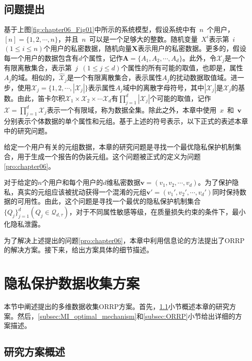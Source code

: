 \subsection{问题提出}\label{sec:chapter06_problem_statement}
基于上图\ref{fig:chapter06_Fig01}中所示的系统模型，假设系统中有~$n$~个用户，$[n]=\{1,2,\cdots,n\}$，并且~$n$~可以是一个足够大的整数。随机变量~$X^i$表示第~$i$~$(1\leq i \leq n)$个用户的私密数据，随机向量$\bm{X}$表示用户的私密数据。更多的，假设每一个用户的数据包含有$d$个属性，记作$\bm{A}=\{A_1,A_2,\cdots,A_d\}$。此外，令$\mathcal{X}_j$是一个有限离散集合，表示第~$j$~$(1 \leq j \leq d)$个属性的所有可能的取值，也即是，属性$A_j$的域。相似的，$\hat{\mathcal{X}}_j$是一个有限离散集合，表示属性$A_j$的扰动数据取值域。进一步，使用$\mathcal{X}_j=\{1,2,\cdots,|\mathcal{X}_j|\}$表示属性$A_j$域中的离散字母符号，其中$|\mathcal{X}_j|$是$\mathcal{X}_j$的基数。由此，笛卡尔积$\mathcal{X}_1\times \mathcal{X}_2\times \cdots \mathcal{X}_d$有$\prod_{j=1}^{d}|\mathcal{X}_j|$个可能的取值，记作$\mathcal{X}=\prod_{j=1}^{d}\mathcal{X}_j$表示一个有限域，称为数据全集。除此之外，本章中使用~$x$~和~$\bm{v}~$分别表示个体数据的单个属性和元组。基于上述的符号表示，以下正式的表述本章中的研究问题。


给定一个用户有关的元组数据，本章的研究问题是寻找一个最优隐私保护机制集合，用于生成一个报告的伪装元组。这个问题被正式的定义为问题\ref{pro:chapter06}。

\begin{problem}\label{pro:chapter06}
对于给定的$n$个用户和每个用户的$d$维私密数据$\bm{v}=(v_1,v_2,\cdots,v_d)$。为了保护隐私，真实的元组应该被扰动获得一个混淆的元组$\bm{v}'=(v_1',v_2',\cdots,v_d')$同时保持数据的可用性。由此，这个问题是寻找一个最优的隐私保护机制集合$\{Q_j\}_{j=1}^d(Q_j \in \mathcal{Q}_{d,\tau})$，对于不同属性敏感等级，在质量损失约束的条件下，最小化隐私泄露。
\end{problem}

为了解决上述提出的问题\ref{pro:chapter06}，本章中利用信息论的方法提出了ORRP的解决方案。接下来，给出方案具体的细节描述。

\section{隐私保护数据收集方案}\label{sec:chapter06_our_scheme}

本节中阐述提出的多维数据收集ORRP方案。首先，\ref{subsec:our_idea}小节概述本章的研究方案。然后，\ref{subsec:MI_optimal_mechanism}和\ref{subsec:ORRP}小节给出详细的方案描述。

 \subsection{研究方案概述}\label{subsec:our_idea}

